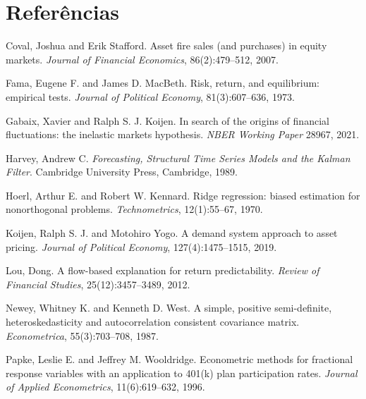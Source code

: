 \documentclass[12pt,a4paper]{article}
\begin{document}
\section*{Referências}
\small
\begin{description}
\item Coval, Joshua and Erik Stafford. Asset fire sales (and purchases) in equity markets.
\emph{Journal of Financial Economics}, 86(2):479--512, 2007.
\item Fama, Eugene F. and James D. MacBeth. Risk, return, and equilibrium: empirical tests.
\emph{Journal of Political Economy}, 81(3):607--636, 1973.
\item Gabaix, Xavier and Ralph S. J. Koijen. In search of the origins of financial
fluctuations: the inelastic markets hypothesis. \emph{NBER Working Paper} 28967, 2021.
\item Harvey, Andrew C. \emph{Forecasting, Structural Time Series Models and the Kalman
Filter}. Cambridge University Press, Cambridge, 1989.
\item Hoerl, Arthur E. and Robert W. Kennard. Ridge regression: biased estimation for
nonorthogonal problems. \emph{Technometrics}, 12(1):55--67, 1970.
\item Koijen, Ralph S. J. and Motohiro Yogo. A demand system approach to asset pricing.
\emph{Journal of Political Economy}, 127(4):1475--1515, 2019.
\item Lou, Dong. A flow-based explanation for return predictability. \emph{Review of
Financial Studies}, 25(12):3457--3489, 2012.
\item Newey, Whitney K. and Kenneth D. West. A simple, positive semi-definite, heteroskedasticity
and autocorrelation consistent covariance matrix. \emph{Econometrica}, 55(3):703--708, 1987.
\item Papke, Leslie E. and Jeffrey M. Wooldridge. Econometric methods for fractional response
variables with an application to 401(k) plan participation rates. \emph{Journal of Applied
Econometrics}, 11(6):619--632, 1996.
\end{description}
\end{document}
